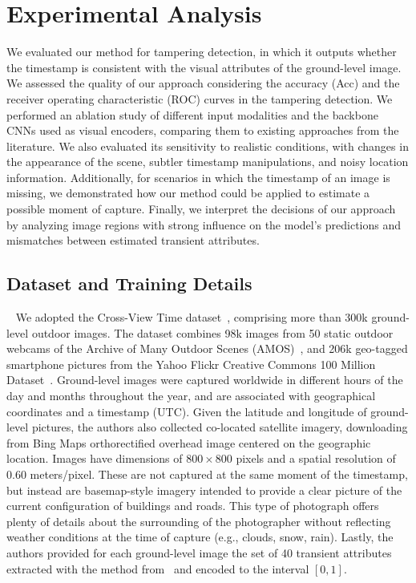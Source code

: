 \documentclass[journal]{IEEEtran}
\begin{document}
\section{Experimental Analysis}\label{sec:exp_analysis}
    We evaluated our method for tampering detection, in which it outputs whether the timestamp is consistent with the visual attributes of the ground-level image. We assessed the quality of our approach considering the accuracy (Acc) and the receiver operating characteristic (ROC) curves in the tampering detection. We performed an ablation study of different input modalities and the backbone CNNs used as visual encoders, comparing them to existing approaches from the literature. We also evaluated its sensitivity to realistic conditions, with changes in the appearance of the scene, subtler timestamp manipulations, and noisy location information. Additionally, for scenarios in which the timestamp of an image is missing, we demonstrated how our method could be applied to estimate a possible moment of capture. Finally, we interpret the decisions of our approach by analyzing image regions with strong influence on the model's predictions and mismatches between estimated transient attributes.



    \subsection{Dataset and Training Details}~\label{sec:dataset_training_details}
        We adopted the Cross-View Time dataset~\cite{salem2020learning}, comprising more than 300k ground-level outdoor images. The dataset combines 98k images from 50 static outdoor webcams of the Archive of Many Outdoor Scenes (AMOS)~\cite{jacobs2007consistent}, and 206k geo-tagged smartphone pictures from the Yahoo Flickr Creative Commons 100 Million Dataset~\cite{thomee2016yfcc100m}.  Ground-level images were captured worldwide in different hours of the day and months throughout the year, and are associated with geographical coordinates and a timestamp (UTC). Given the latitude and longitude of ground-level pictures, the authors also collected co-located satellite imagery, downloading from Bing Maps orthorectified overhead image centered on the geographic location. Images have dimensions of $800\times800$ pixels and a spatial resolution of 0.60 meters/pixel. These are not captured at the same moment of the timestamp, but instead are basemap-style imagery intended to provide a clear picture of the current configuration of buildings and roads. This type of photograph offers plenty of details about the surrounding of the photographer without reflecting weather conditions at the time of capture (e.g., clouds, snow, rain). Lastly, the authors provided for each ground-level image the set of 40 transient attributes extracted with the method from~\cite{laffont2014transient} and encoded to the interval $[0, 1]$.
        
\end{document}
